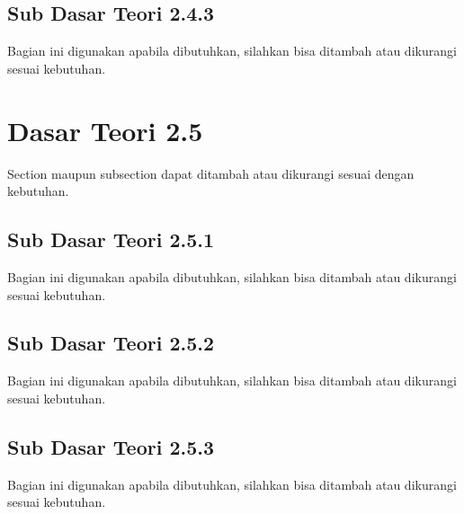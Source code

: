 \subsection{Sub Dasar Teori 2.4.3}
Bagian ini digunakan apabila dibutuhkan, silahkan bisa ditambah atau dikurangi sesuai kebutuhan.

\section{Dasar Teori 2.5}
\noindent Section maupun subsection dapat ditambah atau dikurangi sesuai dengan kebutuhan.

\subsection{Sub Dasar Teori 2.5.1}
Bagian ini digunakan apabila dibutuhkan, silahkan bisa ditambah atau dikurangi sesuai kebutuhan.

\subsection{Sub Dasar Teori 2.5.2}
Bagian ini digunakan apabila dibutuhkan, silahkan bisa ditambah atau dikurangi sesuai kebutuhan.

\subsection{Sub Dasar Teori 2.5.3}
Bagian ini digunakan apabila dibutuhkan, silahkan bisa ditambah atau dikurangi sesuai kebutuhan.
